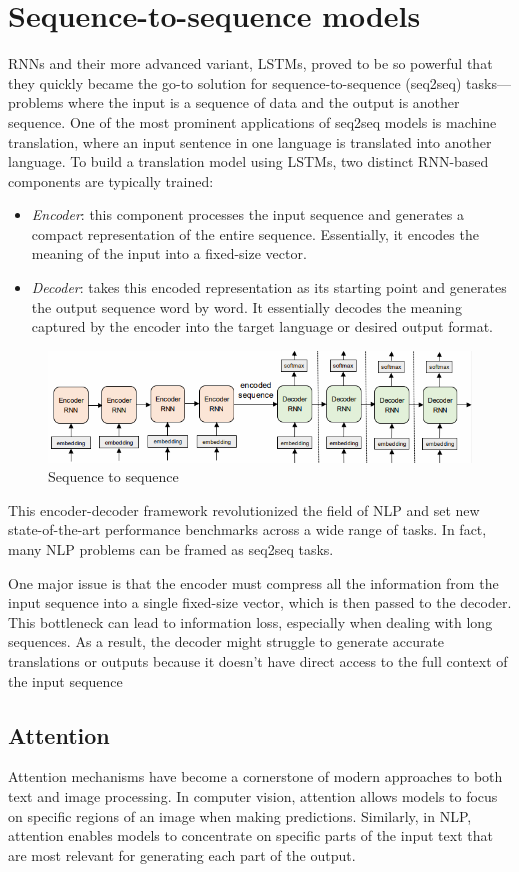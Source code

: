 \section{Sequence-to-sequence models}

RNNs and their more advanced variant, LSTMs, proved to be so powerful that they quickly became the go-to solution for sequence-to-sequence (seq2seq) tasks—problems where the input is a sequence of data and the output is another sequence. 
One of the most prominent applications of seq2seq models is machine translation, where an input sentence in one language is translated into another language.
To build a translation model using LSTMs, two distinct RNN-based components are typically trained:
\begin{itemize}
    \item \textit{Encoder}: this component processes the input sequence and generates a compact representation of the entire sequence. 
        Essentially, it encodes the meaning of the input into a fixed-size vector.
    \item \textit{Decoder}: takes this encoded representation as its starting point and generates the output sequence word by word. 
        It essentially decodes the meaning captured by the encoder into the target language or desired output format.
\end{itemize}
\begin{figure}[H]
    \centering
    \includegraphics[width=0.5\linewidth]{images/nlp3.png}
    \caption{Sequence to sequence}
\end{figure}
\noindent This encoder-decoder framework revolutionized the field of NLP and set new state-of-the-art performance benchmarks across a wide range of tasks.
In fact, many NLP problems can be framed as seq2seq tasks.

One major issue is that the encoder must compress all the information from the input sequence into a single fixed-size vector, which is then passed to the decoder. 
This bottleneck can lead to information loss, especially when dealing with long sequences.
As a result, the decoder might struggle to generate accurate translations or outputs because it doesn't have direct access to the full context of the input sequence

\subsection{Attention}
Attention mechanisms have become a cornerstone of modern approaches to both text and image processing. 
In computer vision, attention allows models to focus on specific regions of an image when making predictions. 
Similarly, in NLP, attention enables models to concentrate on specific parts of the input text that are most relevant for generating each part of the output.

